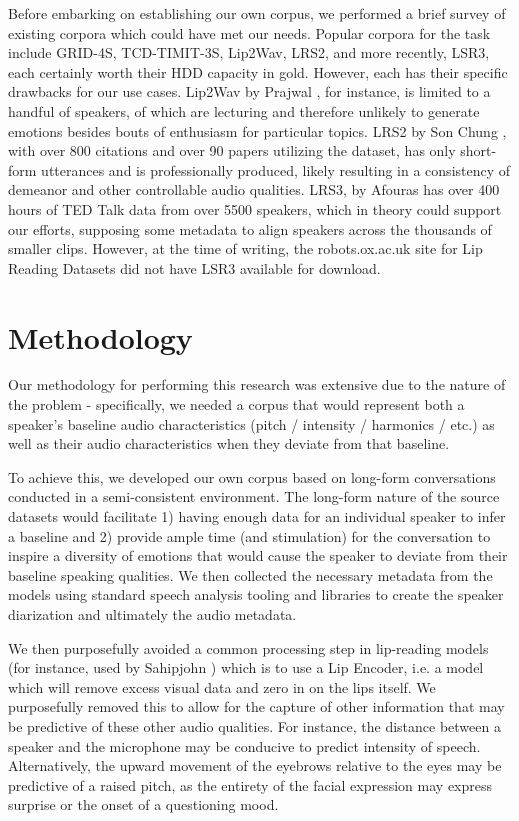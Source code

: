 \documentclass[10pt,twocolumn,letterpaper]{article}
\begin{document}
Before embarking on establishing our own corpus, we performed a brief survey of existing corpora which could have met our needs. Popular corpora for the task include GRID-4S, TCD-TIMIT-3S, Lip2Wav, LRS2, and more recently, LSR3, each certainly worth their HDD capacity in gold. However, each has their specific drawbacks for our use cases. Lip2Wav by Prajwal \cite{LipWavCorpus2020}, for instance, is limited to a handful of speakers, of which are lecturing and therefore unlikely to generate emotions besides bouts of enthusiasm for particular topics.  LRS2 by Son Chung \cite{LipCorpus2017}, with over 800 citations and over 90 papers utilizing the dataset, has only short-form utterances and is professionally produced, likely resulting in a consistency of demeanor and other controllable audio qualities. LRS3, by Afouras \cite{LSR3} has over 400 hours of TED Talk data from over 5500 speakers, which in theory could support our efforts, supposing some metadata to align speakers across the thousands of smaller clips. However, at the time of writing, the robots.ox.ac.uk site for Lip Reading Datasets did not have LSR3 available for download. 

\section{Methodology}
\label{sec:methodology}

Our methodology for performing this research was extensive due to the nature of the problem - specifically, we needed a corpus that would represent both a speaker's baseline audio characteristics (pitch / intensity / harmonics / etc.) as well as their audio characteristics when they deviate from that baseline. 

To achieve this, we developed our own corpus based on long-form conversations conducted in a semi-consistent environment. The long-form nature of the source datasets would facilitate 1) having enough data for an individual speaker to infer a baseline and 2) provide ample time (and stimulation) for the conversation to inspire a diversity of emotions that would cause the speaker to deviate from their baseline speaking qualities. We then collected the necessary metadata from the models using standard speech analysis tooling and libraries to create the speaker diarization and ultimately the audio metadata. 

We then purposefully avoided a common processing step in lip-reading models (for instance, used by Sahipjohn \etal \cite{RobustL2S} )  which is to use a Lip Encoder, i.e. a model which will remove excess visual data and zero in on the lips itself. We purposefully removed this to allow for the capture of other information that may be predictive of these other audio qualities. For instance, the distance between a speaker and the microphone may be conducive to predict intensity of speech. Alternatively, the upward movement of the eyebrows relative to the eyes may be predictive of a raised pitch, as the entirety of the facial expression may express surprise or the onset of a questioning mood.   
\end{document}
